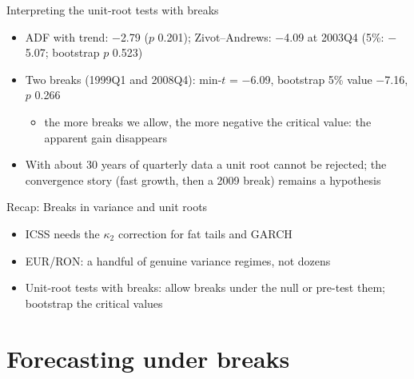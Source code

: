 \begin{frame}{Interpreting the unit-root tests with breaks}
\itemsize{\small}
\begin{itemize}
    \item ADF with trend: \ensuremath{-}2.79 ($p$ 0.201); Zivot--Andrews: \ensuremath{-}4.09 at 2003Q4 (5\%: \ensuremath{-}5.07; bootstrap $p$ 0.523)
    \item Two breaks (1999Q1 and 2008Q4): min-$t$ = \ensuremath{-}6.09, bootstrap 5\% value \ensuremath{-}7.16, $p$ 0.266
    \begin{itemize}
        \item the more breaks we allow, the more negative the critical value: the apparent gain disappears
    \end{itemize}
    \item With about 30 years of quarterly data a unit root cannot be rejected; the convergence story (fast growth, then a 2009 break) remains a hypothesis
\end{itemize}
\end{frame}

\begin{frame}{Recap: Breaks in variance and unit roots}
\itemsize{\small}
\begin{itemize}
    \item ICSS needs the $\kappa_2$ correction for fat tails and GARCH
    \item EUR/RON: a handful of genuine variance regimes, not dozens
    \item Unit-root tests with breaks: allow breaks under the null or pre-test them; bootstrap the critical values
\end{itemize}
\end{frame}


\section{Forecasting under breaks}

